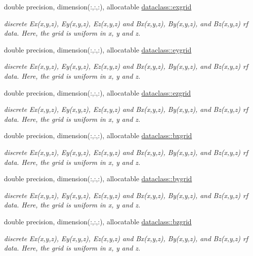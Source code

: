\textbf{ }\par
\begin{DoxyCompactItemize}
\item 
double precision, dimension(\+:,\+:,\+:), allocatable \mbox{\hyperlink{namespacedataclass_a3379b2d98107a6908aabb71e53031c00}{dataclass\+::exgrid}}
\begin{DoxyCompactList}\small\item\em discrete Ex(x,y,z), Ey(x,y,z), Ez(x,y,z) and Bx(x,y,z), By(x,y,z), and Bz(x,y,z) rf data. Here, the grid is uniform in x, y and z. \end{DoxyCompactList}\item 
double precision, dimension(\+:,\+:,\+:), allocatable \mbox{\hyperlink{namespacedataclass_a85c21f161fb74970fc84639092c193dd}{dataclass\+::eygrid}}
\begin{DoxyCompactList}\small\item\em discrete Ex(x,y,z), Ey(x,y,z), Ez(x,y,z) and Bx(x,y,z), By(x,y,z), and Bz(x,y,z) rf data. Here, the grid is uniform in x, y and z. \end{DoxyCompactList}\item 
double precision, dimension(\+:,\+:,\+:), allocatable \mbox{\hyperlink{namespacedataclass_aff9491f2e1258faccd2530eace979c78}{dataclass\+::ezgrid}}
\begin{DoxyCompactList}\small\item\em discrete Ex(x,y,z), Ey(x,y,z), Ez(x,y,z) and Bx(x,y,z), By(x,y,z), and Bz(x,y,z) rf data. Here, the grid is uniform in x, y and z. \end{DoxyCompactList}\item 
double precision, dimension(\+:,\+:,\+:), allocatable \mbox{\hyperlink{namespacedataclass_ad10657f6c8e764ba3c355bd0e2c98a01}{dataclass\+::bxgrid}}
\begin{DoxyCompactList}\small\item\em discrete Ex(x,y,z), Ey(x,y,z), Ez(x,y,z) and Bx(x,y,z), By(x,y,z), and Bz(x,y,z) rf data. Here, the grid is uniform in x, y and z. \end{DoxyCompactList}\item 
double precision, dimension(\+:,\+:,\+:), allocatable \mbox{\hyperlink{namespacedataclass_aa12722da71ea440ed769b715936c87a3}{dataclass\+::bygrid}}
\begin{DoxyCompactList}\small\item\em discrete Ex(x,y,z), Ey(x,y,z), Ez(x,y,z) and Bx(x,y,z), By(x,y,z), and Bz(x,y,z) rf data. Here, the grid is uniform in x, y and z. \end{DoxyCompactList}\item 
double precision, dimension(\+:,\+:,\+:), allocatable \mbox{\hyperlink{namespacedataclass_aabd84b55c65371356291620ee4dceb06}{dataclass\+::bzgrid}}
\begin{DoxyCompactList}\small\item\em discrete Ex(x,y,z), Ey(x,y,z), Ez(x,y,z) and Bx(x,y,z), By(x,y,z), and Bz(x,y,z) rf data. Here, the grid is uniform in x, y and z. \end{DoxyCompactList}\end{DoxyCompactItemize}

